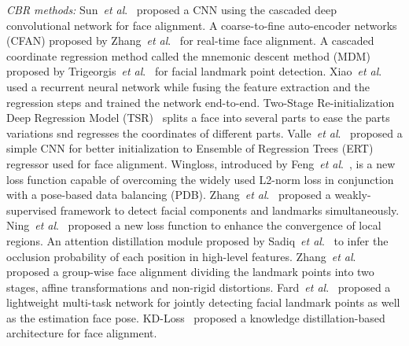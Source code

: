 \documentclass[a4paper,conference]{IEEEtran}
\newcommand{\etal}{\textit{et al}.}
\begin{document}
\textit{CBR methods:} Sun~\etal~\cite{sun2013deep} proposed a CNN using the cascaded deep convolutional network for face alignment. A coarse-to-fine auto-encoder networks (CFAN) proposed by Zhang~\etal~\cite{zhang2014coarse} for real-time face alignment. A cascaded coordinate regression method called the mnemonic descent method (MDM) proposed by  Trigeorgis~\etal~\cite{trigeorgis2016mnemonic} for facial landmark point detection. Xiao~\etal~\cite{xiao2016robust} used a recurrent neural network while fusing the feature extraction and the regression steps and trained the network end-to-end. Two-Stage Re-initialization Deep Regression Model (TSR)~\cite{lv2017deep} splits a face into several parts to ease the parts variations snd regresses the coordinates of different parts. Valle~\etal~\cite{valle2018deeply} proposed a simple CNN for better initialization to Ensemble of Regression Trees (ERT) regressor used for face alignment. Wingloss, introduced by Feng~\etal~\cite{feng2018wing}, is a new loss function capable of overcoming the widely used L2-norm loss in conjunction with a pose-based data balancing (PDB). Zhang~\etal~\cite{zhang2019facial} proposed a weakly-supervised framework to detect facial components and landmarks simultaneously. Ning~\etal~\cite{ning2020cpu} proposed a new loss function to enhance the convergence of local regions. An attention distillation module proposed by Sadiq~\etal~\cite{sadiq2019facial} to infer the occlusion probability of each position in high-level features. Zhang~\etal~\cite{zhang2020phased} proposed a group-wise face alignment dividing the landmark points into two stages, affine transformations and non-rigid distortions. Fard~\etal~\cite{fard2021asmnet} proposed a lightweight multi-task network for jointly detecting facial landmark points as well as the estimation face pose. KD-Loss~\cite{fard2021facial} proposed a knowledge distillation-based architecture for face alignment.
\end{document}
